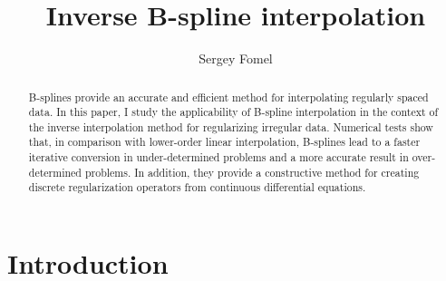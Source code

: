 

\title{Inverse B-spline interpolation}


\author{Sergey Fomel}

\maketitle

\begin{abstract}
B-splines provide an accurate and efficient method for interpolating
  regularly spaced data. In this paper, I study the applicability of
  B-spline interpolation in the context of the inverse interpolation
  method for regularizing irregular data.  Numerical tests show that,
  in comparison with lower-order linear interpolation, B-splines lead
  to a faster iterative conversion in under-determined problems and a
  more accurate result in over-determined problems. In addition, they
  provide a constructive method for creating discrete regularization
  operators from continuous differential equations.
\end{abstract}

\section{Introduction}

